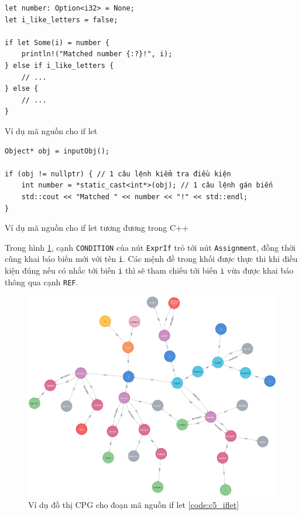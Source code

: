 \begin{listing}[H]
\begin{verbatim}
let number: Option<i32> = None;
let i_like_letters = false;

if let Some(i) = number {
    println!("Matched number {:?}!", i);
} else if i_like_letters {
    // ...
} else {
    // ...
}
\end{verbatim}
\caption{Ví dụ mã nguồn cho if let}
\label{code:c5_iflet}
\end{listing}

\begin{listing}[H]
\begin{verbatim}
Object* obj = inputObj();

if (obj != nullptr) { // 1 câu lệnh kiểm tra điều kiện
    int number = *static_cast<int*>(obj); // 1 câu lệnh gán biến
    std::cout << "Matched " << number << "!" << std::endl;
}
\end{verbatim}
\caption{Ví dụ mã nguồn cho if let tương đương trong C++}
\label{code:c5_iflet_cpp}
\end{listing}

Trong hình \ref{img:c5_cpg_iflet}, cạnh \texttt{CONDITION} của nút \texttt{ExprIf} trỏ tới nút \texttt{Assignment}, đồng thời cũng khai báo biến mới với tên \texttt{i}.
Các mệnh đề trong khối được thực thi khi điều kiện đúng nếu có nhắc tới biến \texttt{i} thì sẽ tham chiếu tới biến \texttt{i} vừa được khai báo thông qua cạnh \texttt{REF}.

\begin{figure}[H]
\includegraphics[width=1\columnwidth]{figures/c5/c5_iflet.png}
\centering
\caption{Ví dụ đồ thị CPG cho đoạn mã nguồn if let \ref{code:c5_iflet}}
\label{img:c5_cpg_iflet}
\end{figure}


